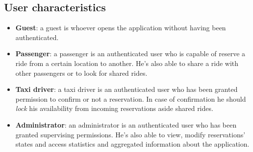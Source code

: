 \subsection{User characteristics}
\begin{itemize}
\item \textbf{Guest}: a guest is whoever opens the application without having been authenticated.
\item \textbf{Passenger}: a passenger is an authenticated user who is capable of reserve a ride from a certain location to another. He's also able to share a ride with other passengers or to look for shared rides.
\item \textbf{Taxi driver}: a taxi driver is an authenticated user who has been granted permission to confirm or not a reservation. In case of confirmation he should \textit{lock} his availability from incoming reservations aside shared rides.
\item \textbf{Administrator}: an administrator is an authenticated user who has been granted supervising permissions. He's also able to view, modify reservations' states and access statistics and aggregated information about the application.
\end{itemize}